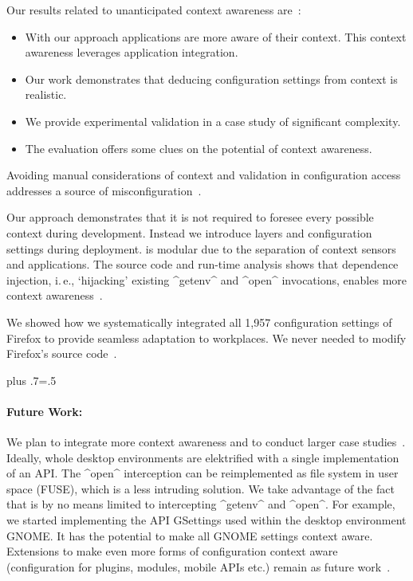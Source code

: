 Our results related to unanticipated context awareness are~\cite{raab2016unanticipated}:
\begin{itemize}
\item With our approach applications are more aware of their context.
This context awareness leverages application integration.
\item Our work demonstrates that deducing configuration settings from context is realistic.
\item We provide experimental validation in a case study of significant complexity.
\item The evaluation offers some clues on the potential of context awareness.
\end{itemize}

Avoiding manual considerations of context and validation in configuration access addresses a source of misconfiguration~\cite{raab2017introducing}.


Our approach demonstrates that it is not required to foresee every possible context during development.
Instead we introduce layers and configuration settings during deployment.
\elektra{} is modular due to the separation of context sensors and applications.
The source code and run-time analysis shows that dependence injection, i.\,e., `hijacking' existing ^getenv^ and ^open^ invocations, enables more context awareness~\cite{raab2017introducing}.

We showed how we systematically integrated all 1,957 configuration settings of Firefox to provide seamless adaptation to workplaces.
We never needed to modify Firefox's source code~\cite{raab2017introducing}.%
{\parfillskip=0pt plus .7\textwidth \emergencystretch=.5\textwidth \par}

\paragraph{Future Work:} We plan to integrate more context awareness and to conduct larger case studies~\cite{raab2016improving}.
Ideally, whole desktop environments are elektrified with a single implementation of an API.
The ^open^ interception can be reimplemented as file system in user space (FUSE), which is a less intruding solution.
We take advantage of the fact that \elektra{} is by no means limited to intercepting ^getenv^ and ^open^.
For example, we started implementing the API GSettings used within the desktop environment GNOME.
It has the potential to make all GNOME settings context aware.
Extensions to make even more forms of configuration context aware (configuration for plugins, modules, mobile APIs etc.) remain as future work~\cite{raab2017introducing}.
